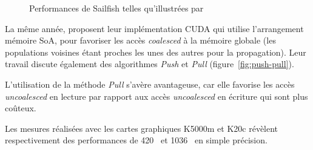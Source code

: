 \begin{figure}[h]
	\centering
	\caption{Performances de Sailfish telles qu'illustrées par \cite{januszewski_sailfish_2014}}
	\label{fig:sailfish_perf}
\end{figure} 

La même année, \citet{mawson_memory_2014} proposent leur implémentation CUDA qui utilise l'arrangement mémoire \acs{SoA}, pour favoriser les accès \textit{coalesced} à la mémoire globale (les populations voisines étant proches les unes des autres pour la propagation). Leur travail discute également des algorithmes \textit{Push} et \textit{Pull} (figure~\ref{fig:push-pull}).

L'utilisation de la méthode \textit{Pull} s'avère avantageuse, car elle favorise les accès \textit{uncoalesced} en lecture par rapport aux accès \textit{uncoalesced} en écriture qui sont plus coûteux.

Les mesures réalisées avec les cartes graphiques K5000m et K20c révèlent respectivement des performances de 420~ et 1036~ en simple précision.\\

